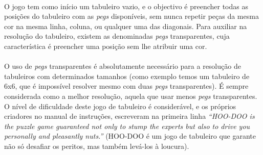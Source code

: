 \documentclass{llncs}
\begin{document}
\paragraph*{}O jogo tem como in\'{i}cio um tabuleiro vazio, e o objectivo \'{e} preencher todas as posi\c{c}\~{o}es do tabuleiro com as \emph{pegs} dispon\'{i}veis, sem nunca repetir pe\c{c}as da mesma cor na mesma linha, coluna, ou qualquer uma das diagonais. Para auxiliar na resolu\c{c}\~{a}o do tabuleiro, existem as denominadas \emph{pegs} transparentes, cuja caracter\'{i}stica \'{e} preencher uma posi\c{c}\~{a}o sem lhe atribuir uma cor.
\paragraph*{} 
O uso de \emph{pegs} transparentes \'{e} absolutamente necess\'{a}rio para a resolu\c{c}\~{a}o de tabuleiros com determinados tamanhos (como exemplo temos um tabuleiro de 6x6, que \'{e} imposs\'{i}vel resolver mesmo com duas \emph{pegs} transparentes). \'{E} sempre considerada como a melhor resolu\c{c}\~{a}o, aquela que usar menos \emph{pegs} transparentes. O n\'{i}vel de dificuldade deste jogo de tabuleiro \'{e} consider\'{a}vel, e os pr\'{o}prios criadores no manual de instru\c{c}\~{o}es, escreveram na primeira linha \textit{“HOO-DOO is the puzzle game guaranteed not only to stump the experts but also to drive you personally and pleasantly nuts.”} (HOO-DOO \'{e} um jogo de tabuleiro que garante n\~{a}o s\'{o} desafiar os peritos, mas tamb\'{e}m lev\'{a}-los \`{a} loucura).



\begin{figure}[h!]
\centering
{}
\quad\quad\quad
{}
\end{figure}
\newpage
\end{document}
